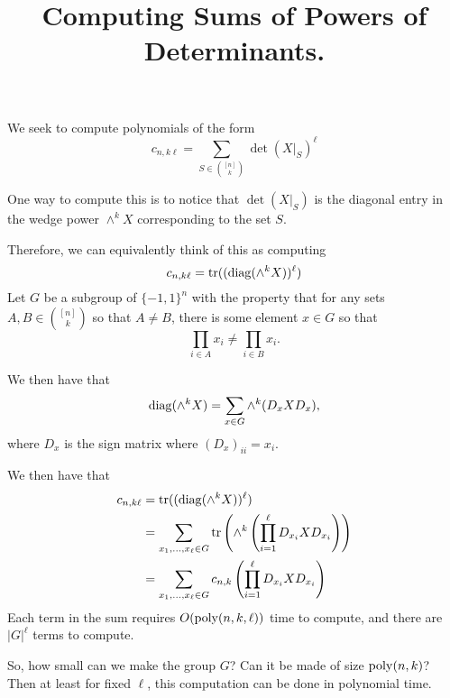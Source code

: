 \documentclass[a4paper]{article}
\author{}
\title{Computing Sums of Powers of Determinants.}
\newcommand{\ksets}{{\binom{[n]}{k}}}
\begin{document}
We seek to compute polynomials of the form
\[
    c_{n,k\ell} = \sum_{S \in \ksets} \det(X|_S)^{\ell}
\]

One way to compute this is to notice that $\det(X|_S)$ is the diagonal entry in the wedge power $\wedge^k X$ corresponding to the set $S$.

Therefore, we can equivalently think of this as computing
\[
    c_{n,k\ell} = \operatorname*{tr}((\operatorname*{diag}(\wedge^k X))^{\ell})
\]
Let $G$ be a subgroup of $\{-1, 1\}^n$ with the property that for any sets $A, B \in \ksets$ so that $A \neq B$, there is some element $x \in G$ so that 
\[
    \prod_{i \in A} x_i \neq 
    \prod_{i \in B} x_i.
\]

We then have that
\[
    \operatorname*{diag}(\wedge^k X) = \sum_{x \in G} \wedge^k (D_xXD_x),
\]
where $D_x$ is the sign matrix where $(D_x)_{ii} = x_i$.

We then have that 
\begin{align*}
    c_{n,k\ell} &= \operatorname*{tr}((\operatorname*{diag}(\wedge^k X))^{\ell})\\
                &= \sum_{x_1 ,\dots, x_{\ell} \in G} \operatorname*{tr}\left(\wedge^k \left(\prod_{i=1}^{\ell}D_{x_i}XD_{x_i}  \right) \right)\\
                &= \sum_{x_1 ,\dots, x_{\ell} \in G} c_{n,k}\left(\prod_{i=1}^{\ell}D_{x_i}XD_{x_i}\right)
\end{align*}
Each term in the sum requires $O(\operatorname*{poly}(n,k,\ell))$  time to compute, and there are $|G|^{\ell}$ terms to compute.

So, how small can we make the group $G$? Can it be made of size $\operatorname*{poly}(n, k)$? Then at least for fixed $\ell$, this computation can be done in polynomial time.
\end{document}
